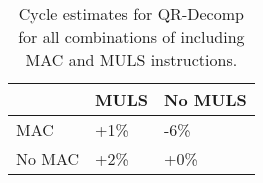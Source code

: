 \begin{table}[ht]
\centering
\begin{tabular}{lll}
  \hline
  & MULS & No MULS \\ 
  \hline
MAC & +1\% & -6\% \\ 
  No MAC & +2\% & +0\% \\ 
   \hline
\end{tabular}
\caption{Cycle estimates for QR-Decomp for all combinations of including MAC and MULS instructions.} 
\end{table}